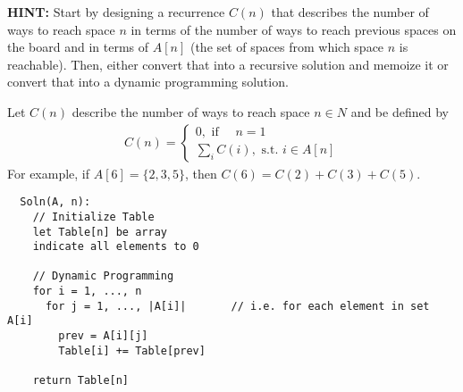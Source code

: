 \documentclass[11pt, oneside]{article}   	%
\theoremstyle{definition}
\theoremstyle{remark}
\begin{document}
\textbf{HINT:} Start by designing a recurrence $C(n)$ that describes the
number of ways to reach space $n$ in terms of the number of ways to
reach previous spaces on the board and in terms of $A[n]$ (the set of
spaces from which space $n$ is reachable). Then, either convert that
into a recursive solution and memoize it or convert that into a
dynamic programming solution.


Let $C(n)$ describe the number of ways to reach space $n\in {N}$ and be defined by
\begin{align*}
	C(n) = \begin{cases}
		0, \text{ if } \quad n=1\\
		\sum_i C(i), \text{ s.t. } i \in A[n]
	\end{cases}
\end{align*}
For example, if $A[6] = \{2, 3, 5\}$, then $C(6)=C(2)+C(3)+C(5)$.

\begin{verbatim}
  Soln(A, n):
    // Initialize Table
    let Table[n] be array
    indicate all elements to 0
    
    // Dynamic Programming
    for i = 1, ..., n
      for j = 1, ..., |A[i]|       // i.e. for each element in set A[i]
        prev = A[i][j]
        Table[i] += Table[prev]
    
    return Table[n]
\end{verbatim}
\end{document}
